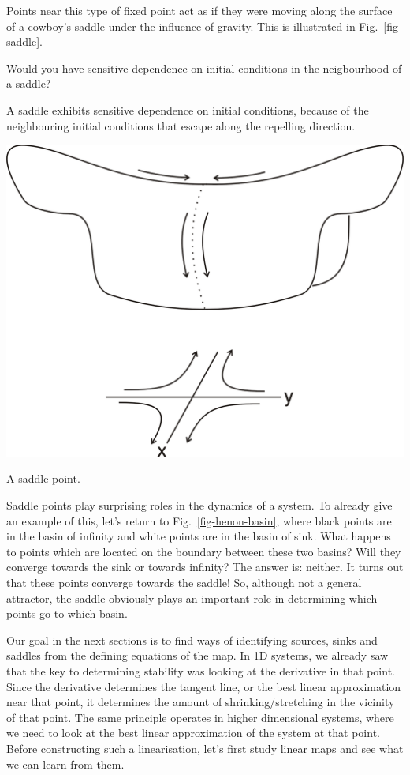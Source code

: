 Points near this type of fixed point act as if they were moving along the surface of a cowboy's saddle under the influence of gravity. This is illustrated in Fig.~\ref{fig-saddle}.

\begin{cue}
Would you have sensitive dependence on initial conditions in the neigbourhood of a saddle?
\end{cue}

A saddle exhibits sensitive dependence on initial conditions, because of the neighbouring initial conditions that escape along the repelling direction.

\begin{marginfigure}
\centering
\includegraphics{dynamic/figures/saddle}
\caption{A saddle point.}
\label{fig-saddle}
\end{marginfigure} 

Saddle points play surprising roles in the dynamics of a system. To already give an example of this, let's return to Fig.~\ref{fig-henon-basin}, where black points are in the basin of infinity and white points are in the basin of sink. What happens to points which are located on the boundary between these two basins? Will they converge towards the sink or towards infinity? The answer is: neither. It turns out that these points converge towards the saddle! So, although not a general attractor, the saddle obviously plays an important role in determining which points go to which basin.

Our goal in the next sections is to find ways of identifying sources, sinks and saddles from the defining equations of the map. In 1D systems, we already saw that the key to determining stability was looking at the derivative in that point. Since the derivative determines the tangent line, or the best linear approximation near that point, it determines the amount of shrinking/stretching in the vicinity of that point. The same principle operates in higher dimensional systems, where we need to look at the best linear approximation of the system at that point. Before constructing such a linearisation, let's first study linear maps and see what we can learn from them.

